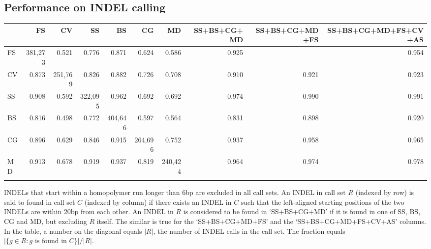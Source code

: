 \documentclass{bioinfo}
\begin{document}
\subsection{Performance on INDEL calling}


\begin{table*}[!htb]
{\begin{tabular*}{\textwidth}{@{\extracolsep{\fill}}lrrrrrrrrr}
\toprule
&FS&CV&SS&BS&CG&MD&SS+BS+CG+MD&SS+BS+CG+MD+FS&SS+BS+CG+MD+FS+CV+AS\\
\midrule
FS&381,273& 0.521 & 0.776 & 0.871 & 0.624 & 0.586 & 0.925 &       & 0.954\\
CV& 0.873 &251,769& 0.826 & 0.882 & 0.726 & 0.708 & 0.910 & 0.921 & 0.923\\
SS& 0.908 & 0.592 &322,095& 0.962 & 0.692 & 0.692 & 0.974 & 0.990 & 0.991\\
BS& 0.816 & 0.498 & 0.772 &404,646& 0.597 & 0.564 & 0.831 & 0.898 & 0.920\\
CG& 0.896 & 0.629 & 0.846 & 0.915 &264,696& 0.752 & 0.937 & 0.958 & 0.965\\
MD& 0.913 & 0.678 & 0.919 & 0.937 & 0.819 &240,424& 0.964 & 0.974 & 0.978\\
\botrule
\end{tabular*}}
{INDELs that start within a homopolymer run longer than 6bp are excluded in
all call sets. An INDEL in call set $R$ (indexed by row) is said to
found in call set $C$ (indexed by column) if there exists an INDEL in $C$
such that the left-aligned starting positions of the two INDELs are within 20bp
from each other.  An INDEL in $R$ is considered to be found in
`\mbox{SS+BS+CG+MD}' if it is found in one of SS, BS, CG and MD, but excluding $R$
itself. The similar is true for the `\mbox{SS+BS+CG+MD+FS}' and the
`\mbox{SS+BS+CG+MD+FS+CV+AS}' columns. In the table, a number on the diagonal equals $|R|$,
the number of INDEL calls in the call set. The fraction equals $|\{g\in R:g
\mbox{ is found in } C\}|/|R|$.}

\end{table*}
\end{document}
